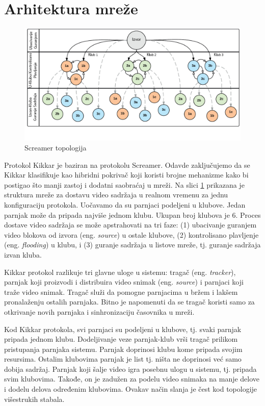 \documentclass[12pt,oneside]{memoir}
\begin{document}
\section{Arhitektura mreže}
\label{Kikkar.1}

\begin{figure}[!ht]
  \centering
  \includegraphics[width=1.05\textwidth]{slike/screamer-topology.jpg}
  \caption{Screamer topologija}
  \label{fig:screamer-topologija}
\end{figure}
\par

Protokol Kikkar je baziran na protokolu Screamer. Odavde zaključujemo da se Kikkar klasifikuje kao hibridni pokrivač koji koristi brojne mehanizme kako bi postigao što manji zastoj i dodatni saobraćaj u mreži. Na slici \ref{fig:screamer-topologija} prikazana je struktura mreže za dostavu video sadržaja u realnom vremenu za jednu konfiguraciju protokola. Uočavamo da su parnjaci podeljeni u klubove. Jedan parnjak može da pripada najviše jednom klubu. Ukupan broj klubova je 6. Proces dostave video sadržaja se može apstrahovati na tri faze: (1) ubacivanje guranjem video blokova od izvora (eng. \textit{source}) u ostale klubove, (2) kontrolisano plavljenje (eng. \textit{flooding}) u klubu, i (3) guranje sadržaja u listove mreže, tj. guranje sadržaja izvan kluba.

Kikkar protokol razlikuje tri glavne uloge u sistemu: tragač (eng. \textit{tracker}), parnjak koji proizvodi i distribuira video snimak (eng. \textit{source}) i parnjaci koji traže video snimak. Tragač služi da pomogne parnjacima u bržem i lakšem pronalaženju ostalih parnjaka. Bitno je napomenuti da se tragač koristi samo za otkrivanje novih parnjaka i sinhronizaciju časovnika u mreži. 

Kod Kikkar protokola, svi parnjaci su podeljeni u klubove, tj. svaki parnjak pripada jednom klubu. Dodeljivanje veze parnjak-klub vrši tragač prilikom pristupanja parnjaka sistemu. Parnjak doprinosi klubu kome pripada svojim resursima. Ostalim klubovima parnjak je list tj. ništa ne doprinosi već samo dobija sadržaj. Parnjak koji šalje video igra posebnu ulogu u sistemu, tj. pripada svim klubovima. Takođe, on je zadužen za podelu video snimaka na manje delove i dodelu delova određenim klubovima. Ovakav način slanja je čest kod topologije višestrukih stabala.
\end{document}
